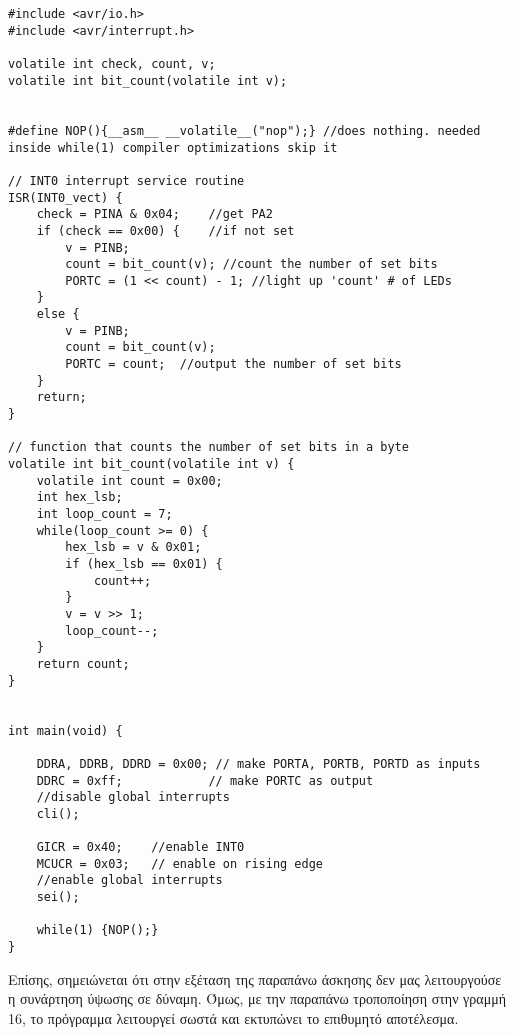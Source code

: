 \documentclass[11pt]{article}
\begin{document}
\begin{verbatim}


#include <avr/io.h>
#include <avr/interrupt.h>

volatile int check, count, v;
volatile int bit_count(volatile int v);


#define NOP(){__asm__ __volatile__("nop");} //does nothing. needed inside while(1) compiler optimizations skip it

// INT0 interrupt service routine
ISR(INT0_vect) {
	check = PINA & 0x04;	//get PA2
	if (check == 0x00) {	//if not set
		v = PINB;
		count = bit_count(v); //count the number of set bits
		PORTC = (1 << count) - 1; //light up 'count' # of LEDs
	}
	else {
		v = PINB;
		count = bit_count(v);
		PORTC = count;	//output the number of set bits
	}
	return;
}

// function that counts the number of set bits in a byte
volatile int bit_count(volatile int v) {
	volatile int count = 0x00;
	int hex_lsb;
	int loop_count = 7;
	while(loop_count >= 0) {
		hex_lsb = v & 0x01;
		if (hex_lsb == 0x01) {
			count++;
		}
		v = v >> 1;
		loop_count--;
	}
	return count;
}


int main(void) {
	
	DDRA, DDRB, DDRD = 0x00; // make PORTA, PORTB, PORTD as inputs
	DDRC = 0xff;			// make PORTC as output
	//disable global interrupts
	cli();
	
	GICR = 0x40;	//enable INT0
	MCUCR = 0x03;	// enable on rising edge
	//enable global interrupts
	sei();
	
	while(1) {NOP();}
}

\end{verbatim}

Επίσης, σημειώνεται ότι στην εξέταση της παραπάνω άσκησης δεν μας λειτουργούσε η συνάρτηση ύψωσης σε δύναμη. Όμως, με την παραπάνω τροποποίηση στην γραμμή 16, το πρόγραμμα λειτουργεί σωστά και εκτυπώνει το επιθυμητό αποτέλεσμα. 
\end{document}
